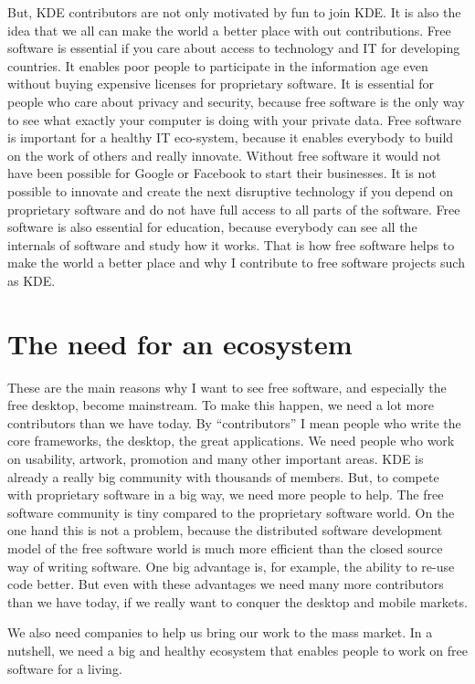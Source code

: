 But, KDE contributors are not only motivated by fun to join KDE. It is also the
idea that we all can make the world a better place with out contributions. Free
software is essential if you care about access to technology and IT for
developing countries. It enables poor people to participate in the information
age even without buying expensive licenses for proprietary software. It is
essential for people who care about privacy and security, because free software
is the only way to see what exactly your computer is doing with your private
data. Free software is important for a healthy IT eco-system, because it enables
everybody to build on the work of others and really innovate. Without free
software it would not have been possible for Google or Facebook to start their
businesses. It is not possible to innovate and create the next disruptive
technology if you depend on proprietary software and do not have full access to
all parts of the software.
Free software is also essential for education, because everybody can see all the
internals of software and study how it works. That is how free software helps to
make the world a better place and why I contribute to free software projects
such as KDE. 

\section*{The need for an ecosystem}

These are the main reasons why I want to see free software, and especially the
free desktop, become mainstream. To make this happen, we need a lot more
contributors than we have today. By ``contributors'' I mean people who write the
core frameworks, the desktop, the great applications. We need people who work on
usability, artwork, promotion and many other important areas. KDE is already a
really big community with thousands of members. But, to compete with proprietary
software in a big way, we need more people to help. The free software community
is tiny compared to the proprietary software world. On the one hand this is not
a problem, because the distributed software development model of the free
software world is much more efficient than the closed source way of writing
software. One big advantage is, for example, the ability to re-use code better.
But even with these advantages we need many more contributors than we have
today, if we really want to conquer the desktop and mobile markets.

We also need companies to help us bring our work to the mass market. In a
nutshell, we need a big and healthy ecosystem that enables people to work on
free software for a living.

